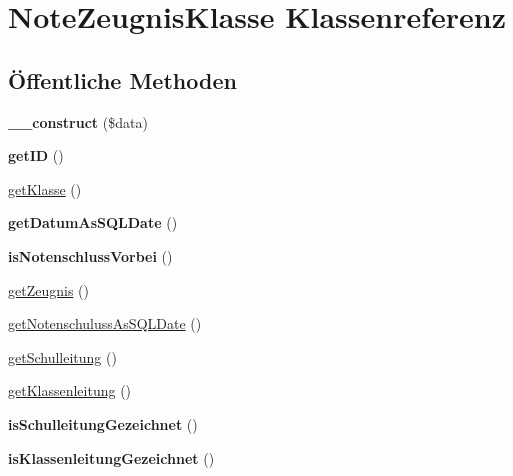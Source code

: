 \hypertarget{class_note_zeugnis_klasse}{}\section{Note\+Zeugnis\+Klasse Klassenreferenz}
\label{class_note_zeugnis_klasse}
\subsection*{Öffentliche Methoden}
\begin{DoxyCompactItemize}
\item 
\mbox{\label{class_note_zeugnis_klasse_a307b1f4081f5dc806eb5e8ac2c7a6f80}} 
{\bfseries \+\_\+\+\_\+construct} (\$data)
\item 
\mbox{\label{class_note_zeugnis_klasse_a225a2b2e98c9938155879ce441634799}} 
{\bfseries get\+ID} ()
\item 
\mbox{\hyperlink{class_note_zeugnis_klasse_ac08441eb03c85f1920cff42ae67d2606}{get\+Klasse}} ()
\item 
\mbox{\label{class_note_zeugnis_klasse_a373803c1e9e46d79a98a356aa6031339}} 
{\bfseries get\+Datum\+As\+S\+Q\+L\+Date} ()
\item 
\mbox{\label{class_note_zeugnis_klasse_a516fd7ca40b24d12a2fee747e89484a6}} 
{\bfseries is\+Notenschluss\+Vorbei} ()
\item 
\mbox{\hyperlink{class_note_zeugnis_klasse_a589840bac3cceb9be7fb60c22aee3c8c}{get\+Zeugnis}} ()
\item 
\mbox{\hyperlink{class_note_zeugnis_klasse_a1716994f79a88f2c80f358e0e3165b87}{get\+Notenschuluss\+As\+S\+Q\+L\+Date}} ()
\item 
\mbox{\hyperlink{class_note_zeugnis_klasse_a2fed95a9ec10c28054d5c23e532e035a}{get\+Schulleitung}} ()
\item 
\mbox{\hyperlink{class_note_zeugnis_klasse_a2cf6fe637934f3f0da6df0b4e7079f04}{get\+Klassenleitung}} ()
\item 
\mbox{\label{class_note_zeugnis_klasse_a861e086f1576bc74e97b6a7d933fa50d}} 
{\bfseries is\+Schulleitung\+Gezeichnet} ()
\item 
\mbox{\label{class_note_zeugnis_klasse_a5338d64d4ed1919cef33a31e39f9c270}} 
{\bfseries is\+Klassenleitung\+Gezeichnet} ()
\end{DoxyCompactItemize}


